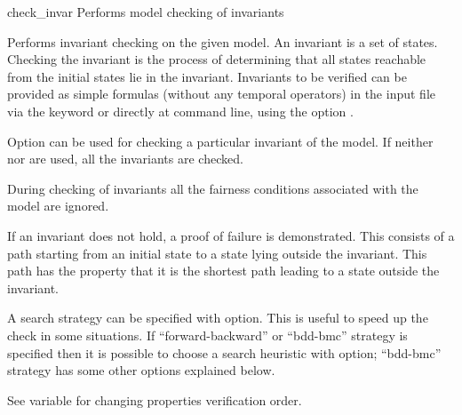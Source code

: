 \begin{nusmvCommand} {check\_invar} {Performs model checking of invariants}


Performs invariant checking on the given model. An invariant is a set
of states. Checking the invariant is the process of determining that
all states reachable from the initial states lie in the invariant.
Invariants to be verified can be provided as simple formulas (without
any temporal operators) in the input file via the 
keyword or directly at command line, using the option .

Option  can be used for checking a particular invariant
of the model. If neither  nor  are used,
all the invariants are checked.

During checking of invariants all the fairness conditions associated
with the model are ignored.

If an invariant does not hold, a proof of failure is demonstrated.
This consists of a path starting from an initial state to a state
lying outside the invariant. This path has the property that it is the
shortest path leading to a state outside the invariant.

A search strategy can be specified with  option. This is
useful to speed up the check in some situations. If
``forward-backward'' or ``bdd-bmc'' strategy is specified then it is
possible to choose a search heuristic with  option;
``bdd-bmc'' strategy has some other options explained below.

See variable  for changing properties
verification order.
\begin{cmdOpt}





\end{cmdOpt}
\end{nusmvCommand}
